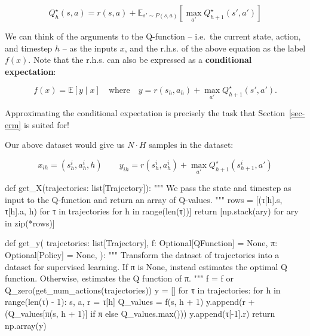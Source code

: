\documentclass[
  letterpaper,
  DIV=11,
  numbers=noendperiod]{scrreprt}
\newenvironment{Shaded}{\begin{snugshade}}{\end{snugshade}}
\newcommand{\NormalTok}[1]{\textcolor[rgb]{0.00,0.23,0.31}{#1}}
\theoremstyle{plain}
\theoremstyle{plain}
\theoremstyle{definition}
\theoremstyle{definition}
\theoremstyle{remark}
\begin{document}
\[
Q_h^\star(s, a) = r(s, a) + \mathbb{E}_{s' \sim P(s, a)} [\max_{a'} Q_{h+1}^\star(s', a')]
\]

We can think of the arguments to the Q-function -- i.e.~the current
state, action, and timestep \(h\) -- as the inputs \(x\), and the r.h.s.
of the above equation as the label \(f(x)\). Note that the r.h.s. can
also be expressed as a \textbf{conditional expectation}:

\[
f(x) = \mathbb{E}[y \mid x] \quad \text{where} \quad y = r(s_h, a_h) + \max_{a'} Q^\star_{h+ 1}(s', a').
\]

Approximating the conditional expectation is precisely the task that
Section~\ref{sec-erm} is suited for!

Our above dataset would give us \(N \cdot H\) samples in the dataset:

\[
x_{i h} = (s_h^i, a_h^i, h) \qquad y_{i h} = r(s_h^i, a_h^i) + \max_{a'} Q^\star_{h+ 1}(s_{h+ 1}^i, a')
\]

\begin{Shaded}
\begin{Highlighting}[]
\NormalTok{def get\_X(trajectories: list[Trajectory]):}
\NormalTok{    """}
\NormalTok{    We pass the state and timestep as input to the Q{-}function}
\NormalTok{    and return an array of Q{-}values.}
\NormalTok{    """}
\NormalTok{    rows = [(τ[h].s, τ[h].a, h) for τ in trajectories for h in range(len(τ))]}
\NormalTok{    return [np.stack(ary) for ary in zip(*rows)]}


\NormalTok{def get\_y(}
\NormalTok{    trajectories: list[Trajectory],}
\NormalTok{    f: Optional[QFunction] = None,}
\NormalTok{    π: Optional[Policy] = None,}
\NormalTok{):}
\NormalTok{    """}
\NormalTok{    Transform the dataset of trajectories into a dataset for supervised learning.}
\NormalTok{    If \textasciigrave{}π\textasciigrave{} is None, instead estimates the optimal Q function.}
\NormalTok{    Otherwise, estimates the Q function of π.}
\NormalTok{    """}
\NormalTok{    f = f or Q\_zero(get\_num\_actions(trajectories))}
\NormalTok{    y = []}
\NormalTok{    for τ in trajectories:}
\NormalTok{        for h in range(len(τ) {-} 1):}
\NormalTok{            s, a, r = τ[h]}
\NormalTok{            Q\_values = f(s, h + 1)}
\NormalTok{            y.append(r + (Q\_values[π(s, h + 1)] if π else Q\_values.max()))}
\NormalTok{        y.append(τ[{-}1].r)}
\NormalTok{    return np.array(y)}
\end{Highlighting}
\end{Shaded}
\end{document}
